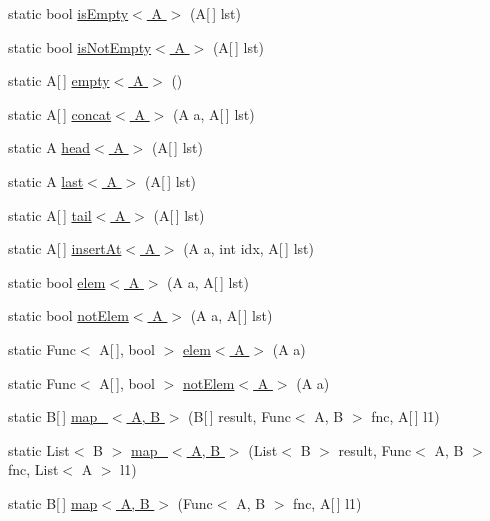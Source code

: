 \begin{DoxyCompactItemize}
\item 
static bool \hyperlink{class_prelude_a6b95b3ae699d56cd15b02028051bd4f2}{is\+Empty$<$ A $>$} (A\mbox{[}$\,$\mbox{]} lst)
\item 
static bool \hyperlink{class_prelude_a968580f1adb70f2054794cd05c1f3a16}{is\+Not\+Empty$<$ A $>$} (A\mbox{[}$\,$\mbox{]} lst)
\item 
static A\mbox{[}$\,$\mbox{]} \hyperlink{class_prelude_a66a7a889cd0bc5e80ab0ed46f2bbe44f}{empty$<$ A $>$} ()
\item 
static A\mbox{[}$\,$\mbox{]} \hyperlink{class_prelude_a57178ab2dee2681ca7d07d19e954db51}{concat$<$ A $>$} (A a, A\mbox{[}$\,$\mbox{]} lst)
\item 
static A \hyperlink{class_prelude_a8efcc872be3f6fa1832d606fb3bad947}{head$<$ A $>$} (A\mbox{[}$\,$\mbox{]} lst)
\item 
static A \hyperlink{class_prelude_af885784524f533dec587d30be3c12de5}{last$<$ A $>$} (A\mbox{[}$\,$\mbox{]} lst)
\item 
static A\mbox{[}$\,$\mbox{]} \hyperlink{class_prelude_a46ffb41422943cc7f05cb70b17cf68f6}{tail$<$ A $>$} (A\mbox{[}$\,$\mbox{]} lst)
\item 
static A\mbox{[}$\,$\mbox{]} \hyperlink{class_prelude_a0cf206e3f3866513d3067cf420c3a96b}{insert\+At$<$ A $>$} (A a, int idx, A\mbox{[}$\,$\mbox{]} lst)
\item 
static bool \hyperlink{class_prelude_ab6e9302a9c9c40eab287ee7fd56cce37}{elem$<$ A $>$} (A a, A\mbox{[}$\,$\mbox{]} lst)
\item 
static bool \hyperlink{class_prelude_a84698699ed40e5d3a13ebc8380344ec3}{not\+Elem$<$ A $>$} (A a, A\mbox{[}$\,$\mbox{]} lst)
\item 
static Func$<$ A\mbox{[}$\,$\mbox{]}, bool $>$ \hyperlink{class_prelude_ada55197441917eeeec3079f981a663a1}{elem$<$ A $>$} (A a)
\item 
static Func$<$ A\mbox{[}$\,$\mbox{]}, bool $>$ \hyperlink{class_prelude_a75639e8ee2a1501f5e1d4e4b09a46b7d}{not\+Elem$<$ A $>$} (A a)
\item 
static B\mbox{[}$\,$\mbox{]} \hyperlink{class_prelude_a0f2ea41ac27440ab965b2f3138919db2}{map\+\_\+$<$ A, B $>$} (B\mbox{[}$\,$\mbox{]} result, Func$<$ A, B $>$ fnc, A\mbox{[}$\,$\mbox{]} l1)
\item 
static List$<$ B $>$ \hyperlink{class_prelude_a66d7e43e7ca0c53f3e8d8744c834bb7a}{map\+\_\+$<$ A, B $>$} (List$<$ B $>$ result, Func$<$ A, B $>$ fnc, List$<$ A $>$ l1)
\item 
static B\mbox{[}$\,$\mbox{]} \hyperlink{class_prelude_a678c5a5d225ffb1a2a31468aad386e6c}{map$<$ A, B $>$} (Func$<$ A, B $>$ fnc, A\mbox{[}$\,$\mbox{]} l1)

\end{DoxyCompactItemize}
